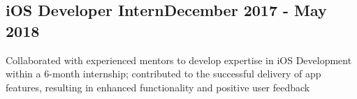 \subsection{{iOS Developer Intern\hfill December 2017 - May 2018}}
\begin{zitemize}
\item Collaborated with experienced mentors to develop expertise in iOS Development within a 6-month internship; contributed to the successful delivery of app features, resulting in enhanced functionality and positive user feedback
    
\end{zitemize}